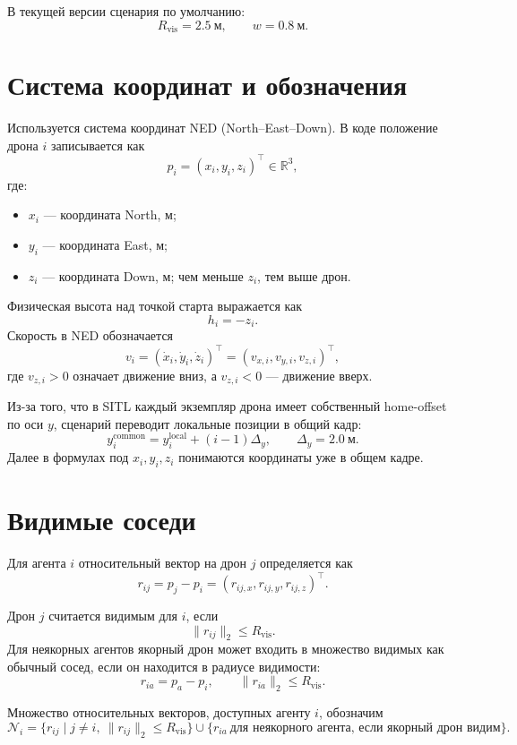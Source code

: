 \documentclass[a4paper,11pt]{article}
\begin{document}
В текущей версии сценария по умолчанию:
\[
R_{\mathrm{vis}}=2.5\ \text{м},\qquad w=0.8\ \text{м}.
\]

\section{Система координат и обозначения}

Используется система координат NED (North--East--Down). В коде положение
дрона $i$ записывается как
\[
  p_i = (x_i,y_i,z_i)^\top \in \mathbb{R}^3,
\]
где:
\begin{itemize}
  \item $x_i$ --- координата North, м;
  \item $y_i$ --- координата East, м;
  \item $z_i$ --- координата Down, м; чем меньше $z_i$, тем выше дрон.
\end{itemize}

Физическая высота над точкой старта выражается как
\[
  h_i = -z_i.
\]
Скорость в NED обозначается
\[
  v_i = (\dot x_i,\dot y_i,\dot z_i)^\top
      = (v_{x,i},v_{y,i},v_{z,i})^\top,
\]
где $v_{z,i}>0$ означает движение вниз, а $v_{z,i}<0$ --- движение вверх.

Из-за того, что в SITL каждый экземпляр дрона имеет собственный home-offset
по оси $y$, сценарий переводит локальные позиции в общий кадр:
\[
  y_i^{\mathrm{common}} = y_i^{\mathrm{local}} + (i-1)\Delta_y,
  \qquad \Delta_y = 2.0\ \text{м}.
\]
Далее в формулах под $x_i,y_i,z_i$ понимаются координаты уже в общем кадре.

\section{Видимые соседи}

Для агента $i$ относительный вектор на дрон $j$ определяется как
\[
  r_{ij}=p_j-p_i=(r_{ij,x},r_{ij,y},r_{ij,z})^\top.
\]

Дрон $j$ считается видимым для $i$, если
\[
  \|r_{ij}\|_2 \le R_{\mathrm{vis}}.
\]
Для неякорных агентов якорный дрон может входить в множество видимых как
обычный сосед, если он находится в радиусе видимости:
\[
  r_{ia}=p_a-p_i,\qquad \|r_{ia}\|_2\le R_{\mathrm{vis}}.
\]

Множество относительных векторов, доступных агенту $i$, обозначим
\[
  \mathcal{N}_i =
  \{r_{ij}\;|\; j\ne i,\ \|r_{ij}\|_2\le R_{\mathrm{vis}}\}
  \cup
  \{r_{ia}\ \text{для неякорного агента, если якорный дрон видим}\}.
\]
\end{document}
